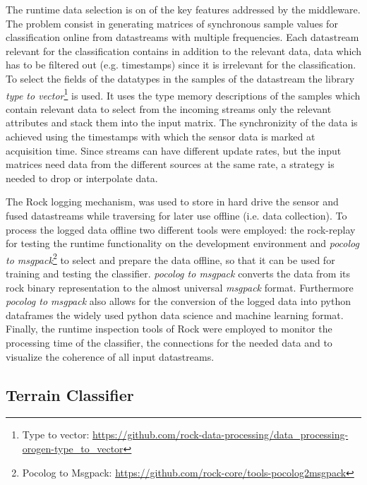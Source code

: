 \documentclass{article}
\begin{document}
The runtime data selection is on of the key features addressed by the middleware. 
The problem consist in generating matrices of synchronous sample values for classification online from datastreams with multiple frequencies.
Each datastream relevant for the classification contains in addition to the relevant data, data which has to be filtered out (e.g. timestamps) since it is irrelevant for the classification.
To select the fields of the datatypes in the samples of the datastream the library \emph{type to vector}\footnote{Type to vector: \url{https://github.com/rock-data-processing/data_processing-orogen-type_to_vector}} is used.
It uses the type memory descriptions of the samples which contain relevant data to select from the incoming streams only the relevant attributes and stack them into the input matrix. 
The synchronizity of the data is achieved using the timestamps with which the sensor data is marked at acquisition time.
Since streams can have different update rates, but the input matrices need data from the different sources at the same rate, a strategy is needed to drop or interpolate data. 

The Rock logging mechanism, was used to store in hard drive the sensor and fused datastreams while traversing for later use offline (i.e. data collection). 
To process the logged data offline two different tools were employed: the rock-replay for testing the runtime functionality on the development environment and \emph{pocolog to msgpack}\footnote{Pocolog to Msgpack: \url{https://github.com/rock-core/tools-pocolog2msgpack}} to select and prepare the data offline, so that it can be used for training and testing the classifier.
\emph{pocolog to msgpack} converts the data from its rock binary representation to the almost universal \emph{msgpack} format.
Furthermore \emph{pocolog to msgpack} also allows for the conversion of the logged data into python dataframes the widely used python data science and machine learning format. 
Finally, the runtime inspection tools of Rock were employed to monitor the processing time of the classifier, the connections for the needed data and to visualize the coherence of all input datastreams. 


\subsection{Terrain Classifier}

\end{document}

